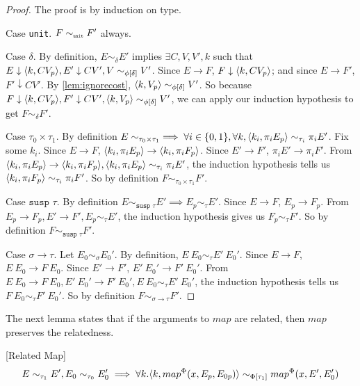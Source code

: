 \begin{proof}
  The proof is by induction on type.

  Case \texttt{unit}.
  $F \sim_{\texttt{\tiny{unit}}} F'$ always.

  Case $\delta$.
  By definition, $E \sim_\delta E'$ implies $\exists C, V, V', k$ such that $E \downarrow \langle k, C V_p \rangle, E' \downarrow C V', V \sim_{\phi[\delta]} V'$.
  Since $E \to F$, $F \downarrow \langle k, C V_p \rangle$; and since $E \to F'$, $F' \downarrow C V'$.
  By \ref{lem:ignorecost}, $\langle k, V_p \rangle \sim_{\phi[\delta]} V'$.
  So because $F \downarrow \langle k, C V_p \rangle, F' \downarrow C V', \langle k, V_p \rangle \sim_{\phi[\delta]} V'$, we can apply our induction hypothesis to get $F \sim_\delta F'$.

  Case $\tau_0 \times \tau_1$.
  By definition $E \sim_{\tau_0 \times \tau_1} \implies \forall i \in \{0, 1\}, \forall k, \langle k_i, \pi_i E_p \rangle \sim_{\tau_i} \pi_i E'$.
  Fix some $k_i$.
  Since $E \to F$, $\langle k_i, \pi_i E_p \rangle \to \langle k_i, \pi_i F_p \rangle$.
  Since $E' \to F'$, $\pi_i E' \to \pi_i F'$.
  From $\langle k_i, \pi_i E_p \rangle \to \langle k_i, \pi_i F_p \rangle, \langle k_i, \pi_i E_p \rangle \sim_{\tau_i} \pi_i E'$, the induction hypothesis tells us $\langle k_i, \pi_i F_p \rangle \sim_{\tau_i} \pi_i F'$.
  So by definition $F \sim_{\tau_0 \times \tau_1} F'$.

  Case $\texttt{susp } \tau$.
  By definition $E \sim_{\texttt{susp }\tau} E' \implies E_p \sim_\tau E'$.
  Since $E \to F$, $E_p \to F_p$.
  From $E_p \to F_p, E' \to F', E_p \sim_\tau E'$, the induction hypothesis gives us $F_p \sim_\tau F'$.
  So by definition $F \sim_{\texttt{susp }\tau} F'$.

  Case $\sigma \to \tau$.
  Let $E_0 \sim_\sigma E_0'$.
  By definition, $E\ E_0 \sim_\tau E'\ E_0'$.
  Since $E \to F$, $E\ E_0 \to F\ E_0$.
  Since $E' \to F'$, $E'\ E_0' \to F'\ E_0'$.
  From $E\ E_0 \to F\ E_0, E'\ E_0' \to F'\ E_0', E\ E_0 \sim_\tau E'\ E_0'$, the induction hypothesis tells us $F\ E_0 \sim_\tau F'\ E_0'$.
  So by definition $F \sim_{\sigma \to \tau} F'$.
\end{proof}
%
The next lemma states that if the arguments to $map$ are related, then $map$
preserves the relatedness.
%
\begin{lemma}
  \label{lem:relatedmap}[Related Map]
  \[ E \sim_{\tau_1} E', E_0 \sim_{\tau_0} E_0' \implies \forall k. \langle k, map^\Phi(x, E_p, E_{0p})\rangle \sim_{\Phi[\tau_1]} map^\Phi(x, E', E_0') \]
\end{lemma}
%
